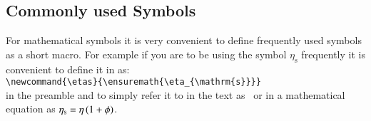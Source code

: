 \subsection{Commonly used Symbols}
For mathematical symbols it is very convenient to define frequently
used symbols as a short macro. For example if you are to be using the
symbol $\eta_{\mathrm{s}}$ frequently it is convenient to define it in
as:\\
\verb|\newcommand{\etas}{\ensuremath{\eta_{\mathrm{s}}}}| \\
in the preamble and to simply refer it to in the text as \etas\ or in
a mathematical equation as $\etas = \eta \, ( 1 + \phi)$.

